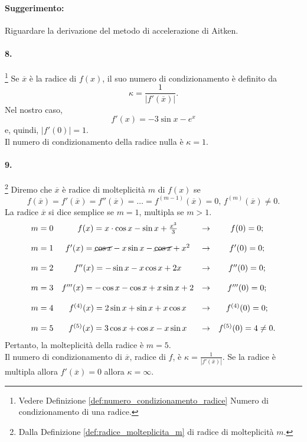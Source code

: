 \paragraph{Suggerimento:} Riguardare la derivazione del metodo di accelerazione di Aitken.

\paragraph{8.}\footnote{Vedere Definizione \ref{def:numero_condizionamento_radice} Numero di condizionamento di una radice.} Se $\overline{x}$ è la radice di $f(x)$, il suo numero di condizionamento è definito da
\begin{equation*}
	\kappa = \frac{1}{|f'(\overline{x})|}.
\end{equation*}
Nel nostro caso,
\begin{equation*}
	f'(x)=-3\sin x - e^x
\end{equation*}
e, quindi, $|f'(0)|=1$.\\
Il numero di condizionamento della radice nulla è $\kappa=1$.

\paragraph{9.}\footnote{Dalla Definizione \ref{def:radice_molteplicita_m} di radice di molteplicità $m$.} Diremo che $\overline{x}$ è radice di molteplicità $m$ di $f(x)$ se
\begin{equation*}
	f(\overline{x})=f'(\overline{x})=f''(\overline{x})=\hdots=f^{(m-1)}(\overline{x})=0,\, f^{(m)}(\overline{x})\neq 0.
\end{equation*}
La radice $\overline{x}$ si dice semplice se $m=1$, multipla se $m>1$.
\begin{equation*}
	\begin{matrix}
		m=0 & f(x) = x\cdot\cos x-\sin x + \frac{x^3}{3} & \rightarrow & f(0)=0 ;\\\\
		m=1 & f'(x) = \cancel{\cos x} - x \sin x - \cancel{\cos x} + x^2 & \rightarrow & f'(0)=0 ;\\\\
		m=2 & f''(x) = -\sin x - x\cos x + 2x & \rightarrow & f''(0)=0 ;\\\\
		m=3 & f'''(x) = -\cos x -\cos x + x\sin x  + 2 & \rightarrow & f'''(0)=0 ;\\\\
		m=4 & f^{(4)}(x) = 2\sin x + \sin x + x\cos x & \rightarrow & f^{(4)}(0)=0 ;\\\\
		m=5 & f^{(5)}(x) = 3\cos x + \cos x - x\sin x & \rightarrow & f^{(5)}(0)=4\neq 0 .
	\end{matrix}
\end{equation*}
Pertanto, la molteplicità della radice è $m=5$.\\
Il numero di condizionamento di $\overline{x}$, radice di $f$, è $\kappa = \frac{1}{|f'(\overline{x})|}$. Se la radice è multipla allora $f'(\overline{x})=0$ allora $\kappa=\infty$.

